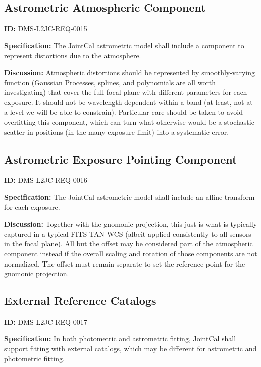 \documentclass[SE,toc,lsstdraft]{lsstdoc}
\begin{document}
\subsection{Astrometric Atmospheric Component}

\label{DMS-L2JC-REQ-0015}
\textbf{ID:} DMS-L2JC-REQ-0015

\textbf{Specification:}
The JointCal astrometric model shall include a component to represent distortions due to the atmosphere.

\textbf{Discussion:}
Atmospheric distortions should be represented by smoothly-varying function (Gaussian Processes, splines, and polynomials are all worth investigating) that cover the full focal plane with different parameters for each exposure.  It should not be wavelength-dependent within a band (at least, not at a level we will be able to constrain).  Particular care should be taken to avoid overfitting this component, which can turn what otherwise would be a stochastic scatter in positions (in the many-exposure limit) into a systematic error.

\subsection{Astrometric Exposure Pointing Component}

\label{DMS-L2JC-REQ-0016}
\textbf{ID:} DMS-L2JC-REQ-0016

\textbf{Specification:}
The JointCal astrometric model shall include an affine transform for each exposure.

\textbf{Discussion:}
Together with the gnomonic projection, this just is what is typically captured in a typical FITS TAN WCS (albeit applied consistently to all sensors in the focal plane).  All but the offset may be considered part of the atmospheric component instead if the overall scaling and rotation of those components are not normalized.  The offset must remain separate to set the reference point for the gnomonic projection.

\subsection{External Reference Catalogs}

\label{DMS-L2JC-REQ-0017}
\textbf{ID:} DMS-L2JC-REQ-0017

\textbf{Specification:}
In both photometric and astrometric fitting, JointCal shall support fitting with external catalogs, which may be different for astrometric and photometric fitting.
\end{document}
